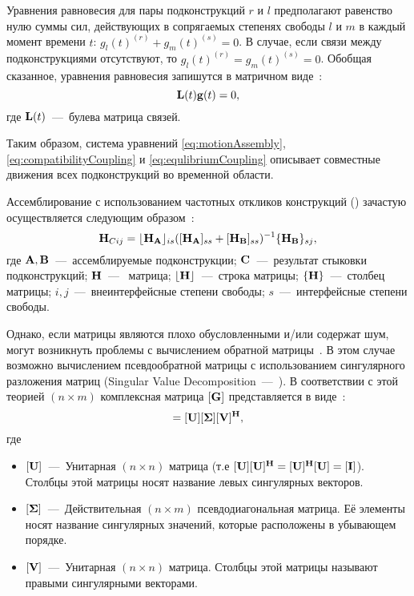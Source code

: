 Уравнения равновесия для пары подконструкций $ r $ и $ l $ предполагают равенство нулю суммы сил, действующих в сопрягаемых степенях свободы $ l $ и $ m $ в каждый момент времени $ t $: $ g_l(t)^{(r)} + g_m(t)^{(s)} = 0 $. В случае, если связи между подконструкциями отсутствуют, то $ g_l(t)^{(r)} = g_m(t)^{(s)} = 0 $. Обобщая сказанное, уравнения равновесия запишутся в матричном виде~\cite{lib:coupling:Klerk}:
\begin{equation}
	\mathbf{L}(t) \mathbf{g} (t) = 0, \label{eq:equlibriumCoupling}
\end{equation}
где $ \mathbf{L}(t) $~---~булева матрица связей.

Таким образом, система уравнений \eqref{eq:motionAssembly}, \eqref{eq:compatibilityCoupling} и \eqref{eq:equlibriumCoupling} описывает совместные движения всех подконструкций во временной области.

Ассемблирование с использованием частотных откликов конструкций () зачастую осуществляется следующим образом~\cite{lib:coupling:Gialamas1996}:
\begin{equation}
	\mathbf{H}_{Cij} = \lfloor \mathbf{H}_{\mathbf{A}} \rfloor_{is} ([\mathbf{H}_{\mathbf{A}}]_{ss} + [\mathbf{H}_{\mathbf{B}}]_{ss})^{-1} \{ \mathbf{H}_{\mathbf{B}} \}_{sj},
\end{equation}
где $\mathbf{A}, \mathbf{B}$~---~ассемблируемые подконструкции; $\mathbf{C}$~---~результат стыковки подконструкций; $\mathbf{H}$~---~ матрица; $\lfloor \mathbf{H} \rfloor$~---~строка  матрицы; $\{ \mathbf{H} \}$~---~столбец  матрицы; $ i, j $~---~внеинтерфейсные степени свободы; $ s $~---~интерфейсные степени свободы.

Однако, если матрицы являются плохо обусловленными и/или содержат шум, могут возникнуть проблемы с вычислением обратной матрицы~\cite{lib:coupling:Gialamas2001}. В этом случае возможно вычислением псевдообратной матрицы с использованием сингулярного разложения матриц (Singular Value Decomposition~---~). В соответствии с этой теорией $ (n \times m) $ комплексная матрица $ [\mathbf{G}] $ представляется в виде~\cite{lib:coupling:Gialamas2001}:
\begin{equation}
	[\mat{G}] = [\mat{U}][\mat{\Sigma}][\mat{V}] ^ \mat{H},
\end{equation}
где 
\begin{itemize}
	\item $ [\mathbf{U}] $~---~Унитарная $(n \times n)$ матрица (т.е $ [\mathbf{U}][\mathbf{U}] ^ {\mathbf{H}} = [\mathbf{U}] ^ {\mathbf{H}}[\mathbf{U}] = [\mathbf{I}] $). Столбцы этой матрицы носят название левых сингулярных векторов.
	\item $[\mathbf{\Sigma}]$~---~Действительная $(n \times m)$ псевдодиагональная матрица. Её элементы носят название сингулярных значений, которые расположены в убывающем порядке.
	\item $[\mathbf{V}]$~---~Унитарная ${(n \times n)}$ матрица. Столбцы этой матрицы называют правыми сингулярными векторами. 
\end{itemize}

